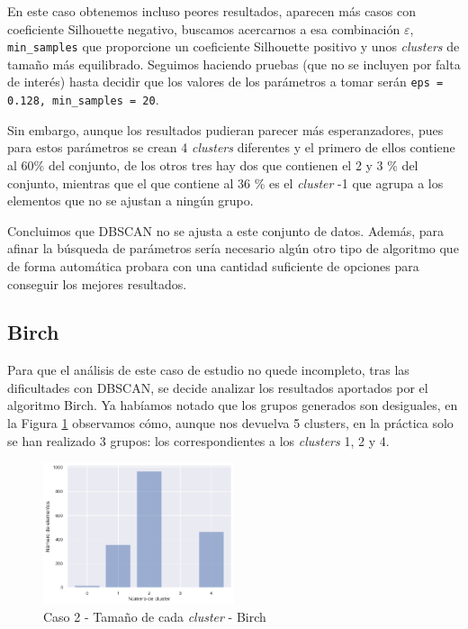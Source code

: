 \documentclass[a4paper, 20pt]{article}
\begin{document}
En este caso obtenemos incluso peores resultados, aparecen más casos con coeficiente Silhouette negativo, buscamos acercarnos a esa combinación $\varepsilon$, \texttt{min\_samples} que proporcione un coeficiente Silhouette positivo y unos \textit{clusters} de tamaño más equilibrado. Seguimos haciendo pruebas (que no se incluyen por falta de interés) hasta decidir que los valores de los parámetros a tomar serán \texttt{eps = 0.128, min\_samples = 20}.

Sin embargo, aunque los resultados pudieran parecer más esperanzadores, pues para estos parámetros se crean 4 \textit{clusters} diferentes y el primero de ellos contiene al 60\% del conjunto, de los otros tres hay dos que contienen el 2 y 3 \% del conjunto, mientras que el que contiene al 36 \% es el \textit{cluster} -1 que agrupa a los elementos que no se ajustan a ningún grupo.

Concluimos que DBSCAN no se ajusta a este conjunto de datos. Además, para afinar la búsqueda de parámetros sería necesario algún otro tipo de algoritmo que de forma automática probara con una cantidad suficiente de opciones para conseguir los mejores resultados.

\subsection{Birch}
Para que el análisis de este caso de estudio no quede incompleto, tras las dificultades con DBSCAN, se decide analizar los resultados aportados por el algoritmo Birch. Ya habíamos notado que los grupos generados son desiguales, en la Figura \ref{fig:birch_tam2} observamos cómo, aunque nos devuelva 5 clusters, en la práctica solo se han realizado 3 grupos: los correspondientes a los \textit{clusters} 1, 2 y 4.

\begin{figure}[H]
    \centering
    \includegraphics[width=0.5\textwidth]{./caso2/Birch_tam_clusters}
    \caption{Caso 2 - Tamaño de cada \textit{cluster} - Birch}
    \label{fig:birch_tam2}
\end{figure}
\end{document}
